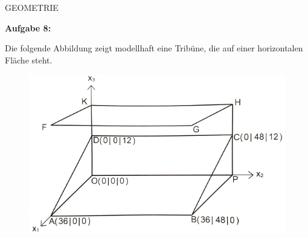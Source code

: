 \documentclass[a4paper,12pt]{article}
\newcommand{\Aufgabe}[1]{
  {
  \vspace*{0.5cm}
  \textsf{\textbf{Aufgabe #1}}
  \vspace*{0.2cm}
  
  }
}
\begin{document}
GEOMETRIE

\Aufgabe{8:} 
Die folgende Abbildung zeigt modellhaft eine Tribüne, die auf einer horizontalen Fläche steht.

\begin{figure}[h!]
  \begin{center}
    \includegraphics[width=0.5\linewidth]{tribüne.jpg}
  \end{center}
\end{figure}


\enlargethispage{2cm}
\end{document}
